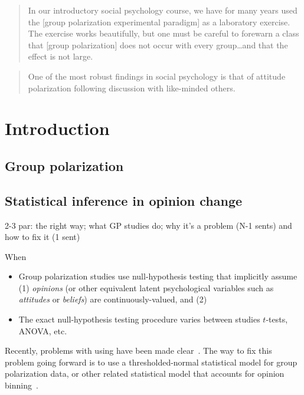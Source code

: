 \documentclass[11pt, letterpaper]{article}
\begin{document}
\begin{quote}
In our introductory social psychology course, 
we have for many years used the [group polarization experimental paradigm] as
a laboratory exercise. The exercise works beautifully, but one must be
careful to forewarn a class that [group polarization] does not occur with every 
group\ldots and that the effect is not large. 
\par\raggedleft\cite[p. 205]{Brown1986}
\end{quote}

\begin{quote}
One of the most robust findings in social psychology is that of attitude polarization 
following discussion with like-minded others.
\par\raggedleft\cite[p. 267]{Cooper2001}
\end{quote}

\section{Introduction}


\subsection{Group polarization}

\subsection{Statistical inference in opinion change}

2-3 par: the right way; what GP studies do; why it's a problem (N-1 sents) and how
to fix it (1 sent)

When 


\begin{itemize}
  \item 
    Group polarization studies use null-hypothesis testing that implicitly
    assume (1) \emph{opinions} (or other equivalent latent psychological variables
    such as \emph{attitudes} or \emph{beliefs}) are continuously-valued, and
    (2) 
  \item
    The exact null-hypothesis testing procedure varies between studies $t$-tests, ANOVA, etc. 
\end{itemize}

Recently, problems with using have been made clear~\cite{Liddell2018}.
The way to fix this problem going forward is to use a thresholded-normal 
statistical model for group polarization data, or other related statistical 
model that accounts for opinion binning~\cite[Ch. 23]{Liddell2018,KruschkeDBDA}.
\end{document}
